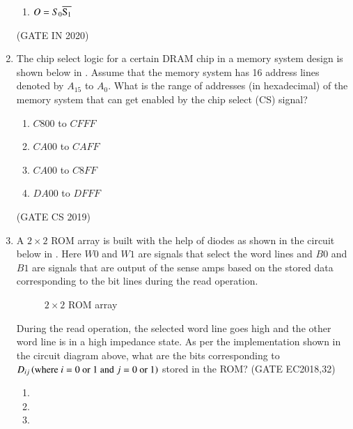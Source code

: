 \begin{enumerate}[label=\arabic*.,ref=\theenumi]
\begin{enumerate}
            \item $O=S_0\overline{\rm S _1}$
 \end{enumerate}
    \hfill (GATE IN 2020)
%
\begin{figure}[H]
	\centering
	\resizebox{0.75\columnwidth}{!}{%

	}
\caption{}
\label{fig:figure13}
\end{figure}
\item  The chip select logic for a certain DRAM chip in a memory system design is shown below
	in
.
	Assume that the memory system has 16 address lines denoted by ${A_{15}}$ to ${A_0}$. What is the range of addresses (in hexadecimal) of the memory system that can get enabled by the chip select (CS) signal?
\begin{enumerate}
\item ${C800}$ to ${CFFF}$
\item ${CA00}$ to ${CAFF}$
\item ${CA00}$ to ${C8FF}$
\item ${DA00}$ to ${DFFF}$
\end{enumerate}  
\hfill (GATE CS 2019)
%
\begin{figure}[H]

\caption{}
\label{fig:figure14}
\end{figure}
%
\item  A $2\times2$ ROM array is built with the help of diodes as shown in the circuit below
	in . Here $W0$ and $W1$ are signals that select the word lines and $B0$ and $B1$ are signals that are output of the sense amps based on the stored data corresponding to the bit lines during the read operation.
%
\begin{figure}[H]
        \centering
	\resizebox{0.75\columnwidth}{!}{%
        
	}
        \caption{ $2\times 2$ ROM array}
	\label{fig:2rom}
\end{figure}
%
		During the read operation, the selected word line goes high and the other word line is in a high impedance state. As per the implementation shown in the circuit diagram above, what are the bits corresponding to $D_{ij}\left(\text{where $i=0$ or $1$ and $j=0$ or $1$}\right)$ stored in the ROM?
	\hfill(GATE EC2018,32)
\begin{enumerate}
    \item {}
    \item {}
    \item {}    

\end{enumerate}
\end{enumerate}
